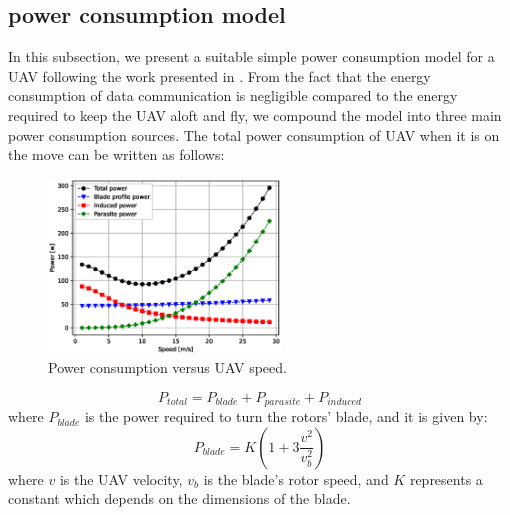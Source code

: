 \documentclass[journal,twocolumn]{IEEEtran}
\begin{document}






\subsection{power consumption model}

In this subsection, we present a suitable simple power consumption model for a UAV following the work presented in \cite{energy_1}. From the fact that the energy consumption of data communication is negligible compared to the energy required to keep the UAV aloft and fly, we compound the model into three main power consumption sources. The total power consumption of UAV when it is on the move can be written as follows:

\begin{figure}
\vspace{-25pt}
\hspace*{-0.2in}
  \centering
  \includegraphics[width=0.55\textwidth]{Figures/speed_fig.eps}
    \vspace*{-5mm}
  \caption{Power consumption versus UAV speed.}\label{power_consum}
\end{figure}

\begin{equation}\label{total_power}
P_{total} = P_{blade} + P_{parasite} + P_{induced}
\end{equation}
where $P_{blade}$ is the power required to turn the rotors’ blade, and it is given by:
\begin{equation}\label{p_blade}
P_{blade} = K\left( 1 + 3\frac{v^2}{v_b^2}\right)
\end{equation}
where $v$ is the UAV velocity, $v_b$ is the blade’s rotor speed, and $K$ represents a constant which depends on the dimensions of the blade.
\end{document}
